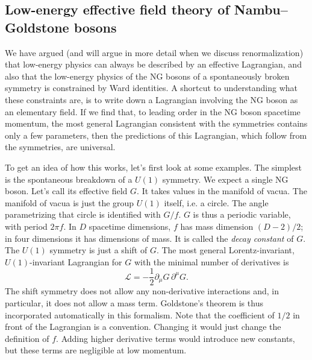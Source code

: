 \subsection{Low-energy effective field theory of Nambu--Goldstone bosons}

We have argued (and will argue in more detail when we discuss renormalization)
that low-energy physics can always be described by an effective Lagrangian, and
also that the low-energy physics of the NG bosons of a spontaneously broken
symmetry is constrained by Ward identities. A shortcut to understanding what
these constraints are, is to write down a Lagrangian involving the NG boson as
an elementary field. If we find that, to leading order in the NG boson
spacetime momentum, the most general Lagrangian consistent with the symmetries contains
only a few parameters, then the predictions of this Lagrangian, which follow
from the symmetries, are universal.

To get an idea of how this works, let's first look at some examples. The
simplest is the spontaneous breakdown of a $U(1)$ symmetry. We expect a single
NG boson. Let's call its effective field $G$. It takes values in the manifold of
vacua. The manifold of vacua is just the group $U(1)$ itself, i.e. a circle.
The angle parametrizing that circle is identified with $G/f$. $G$ is thus a
periodic variable, with period $2\pi f$. In $D$ spacetime dimensions, $f$ has
mass dimension $(D-2)/2$; in four dimensions it has dimensions of mass. It is
called the \emph{decay constant} of $G$. The $U(1)$ symmetry is just a shift of
$G$. The most general Lorentz-invariant, $U(1)$-invariant Lagrangian for $G$
with the minimal number of derivatives is
\begin{equation}
  \mathcal L=-\frac12\partial_\mu G\,\partial^\mu G.
  \label{eq:7.1}
\end{equation}
The shift symmetry does not allow any non-derivative interactions and, in
particular, it does not allow a mass term. Goldstone's theorem is thus
incorporated automatically in this formalism. Note that the coefficient of
$1/2$ in front of the Lagrangian is a convention. Changing it would just change
the definition of $f$. Adding higher derivative terms would introduce new
constants, but these terms are negligible at low momentum.

